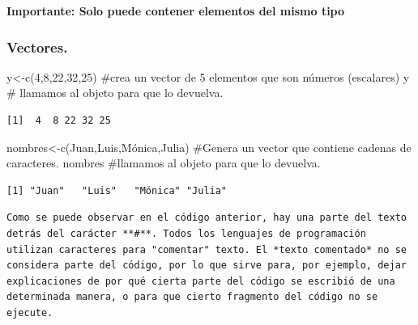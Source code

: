 \documentclass[
  letterpaper,
  DIV=11,
  numbers=noendperiod]{scrreprt}
\newenvironment{Shaded}{\begin{snugshade}}{\end{snugshade}}
\newcommand{\CommentTok}[1]{\textcolor[rgb]{0.37,0.37,0.37}{#1}}
\newcommand{\DecValTok}[1]{\textcolor[rgb]{0.68,0.00,0.00}{#1}}
\newcommand{\FunctionTok}[1]{\textcolor[rgb]{0.28,0.35,0.67}{#1}}
\newcommand{\NormalTok}[1]{\textcolor[rgb]{0.00,0.23,0.31}{#1}}
\newcommand{\OtherTok}[1]{\textcolor[rgb]{0.00,0.23,0.31}{#1}}
\newcommand{\StringTok}[1]{\textcolor[rgb]{0.13,0.47,0.30}{#1}}
\begin{document}
\textbf{Importante: Solo puede contener elementos del mismo tipo}

\hypertarget{vectores.}{%
\subsubsection{Vectores.}\label{vectores.}}

\begin{Shaded}
\begin{Highlighting}[]
\NormalTok{y}\OtherTok{\textless{}{-}}\FunctionTok{c}\NormalTok{(}\DecValTok{4}\NormalTok{,}\DecValTok{8}\NormalTok{,}\DecValTok{22}\NormalTok{,}\DecValTok{32}\NormalTok{,}\DecValTok{25}\NormalTok{) }\CommentTok{\#crea un vector de 5 elementos que son números (escalares)}
\NormalTok{y }\CommentTok{\# llamamos al objeto para que lo devuelva.}
\end{Highlighting}
\end{Shaded}

\begin{verbatim}
[1]  4  8 22 32 25
\end{verbatim}

\begin{Shaded}
\begin{Highlighting}[]
\NormalTok{nombres}\OtherTok{\textless{}{-}}\FunctionTok{c}\NormalTok{(}\StringTok{\textquotesingle{}Juan\textquotesingle{}}\NormalTok{,}\StringTok{\textquotesingle{}Luis\textquotesingle{}}\NormalTok{,}\StringTok{\textquotesingle{}Mónica\textquotesingle{}}\NormalTok{,}\StringTok{\textquotesingle{}Julia\textquotesingle{}}\NormalTok{) }\CommentTok{\#Genera un vector que contiene cadenas de caracteres.}
\NormalTok{nombres }\CommentTok{\#llamamos al objeto para que lo devuelva.}
\end{Highlighting}
\end{Shaded}

\begin{verbatim}
[1] "Juan"   "Luis"   "Mónica" "Julia" 
\end{verbatim}

\begin{verbatim}
Como se puede observar en el código anterior, hay una parte del texto detrás del carácter **#**. Todos los lenguajes de programación utilizan caracteres para "comentar" texto. El *texto comentado* no se considera parte del código, por lo que sirve para, por ejemplo, dejar explicaciones de por qué cierta parte del código se escribió de una determinada manera, o para que cierto fragmento del código no se ejecute.
\end{verbatim}
\end{document}
